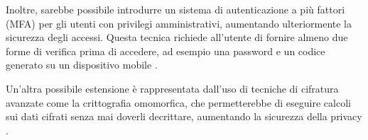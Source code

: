 Inoltre, sarebbe possibile introdurre un sistema di autenticazione a più fattori (MFA) per gli utenti con privilegi amministrativi, aumentando ulteriormente la sicurezza degli accessi. Questa tecnica richiede all'utente di fornire almeno due forme di verifica prima di accedere, ad esempio una password e un codice generato su un dispositivo mobile \cite{bonneau2012quest}.

Un’altra possibile estensione è rappresentata dall’uso di tecniche di cifratura avanzate come la crittografia omomorfica, che permetterebbe di eseguire calcoli sui dati cifrati senza mai doverli decrittare, aumentando la sicurezza della privacy \cite{gentry2009fully}.



